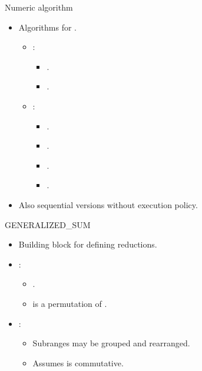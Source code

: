 \begin{frame}[t]{Numeric algorithm}
\begin{itemize}
  \item Algorithms for .
    \begin{itemize}
      \item {}:
        \begin{itemize}
          \item {}.
          \item {}.
        \end{itemize}
      \item {}:
        \begin{itemize}
          \item {}.
          \item {}.
          \item {}.
          \item {}.
        \end{itemize}
    \end{itemize}
  \vfill
  \item Also sequential versions without execution policy.
\end{itemize}
\end{frame}

\begin{frame}[t]{GENERALIZED\_SUM}
\begin{itemize}
  \item Building block for defining reductions.
  \vfill
  \item {}:
    \begin{itemize}
      \item {}.
      \item {} is a permutation of .
    \end{itemize}
  \vfill
  \item {}:
    \begin{itemize}
      \item Subranges may be grouped and rearranged.
      \item Assumes  is commutative.
    \end{itemize}
\end{itemize}
\end{frame}


